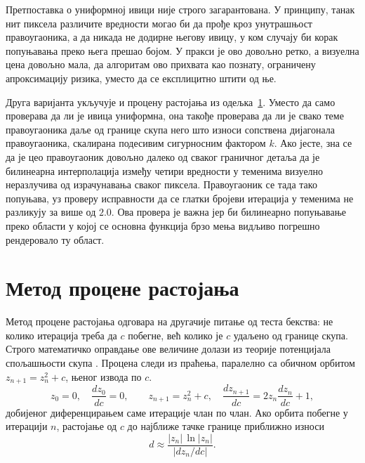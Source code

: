 \documentclass[serbian]{ftndiplomski}
\begin{document}
Претпоставка о униформној ивици није строго загарантована. У принципу, танак нит
пиксела различите вредности могао би да прође кроз унутрашњост правоугаоника, а да
никада не додирне његову ивицу, у ком случају би корак попуњавања преко њега прешао
бојом. У пракси је ово довољно ретко, а визуелна цена довољно мала, да алгоритам ово
прихвата као познату, ограничену апроксимацију ризика, уместо да се експлицитно штити
од ње.

Друга варијанта укључује и процену растојања из одељка~\ref{sec:dem}. Уместо да само
проверава да ли је ивица униформна, она такође проверава да ли је свако теме
правоугаоника даље од границе скупа него што износи сопствена дијагонала
правоугаоника, скалирана подесивим сигурносним фактором $k$. Ако јесте, зна се да је
цео правоугаоник довољно далеко од сваког граничног детаља да је билинеарна
интерполација између четири вредности у теменима визуелно неразлучива од израчунавања
сваког пиксела. Правоугаоник се тада тако попуњава, уз проверу исправности да се
глатки бројеви итерација у теменима не разликују за више од $2.0$. Ова провера је
важна јер би билинеарно попуњавање преко области у којој се основна функција брзо
мења видљиво погрешно рендеровало ту област.

\section{Метод процене растојања}
\label{sec:dem}

Метод процене растојања \cite{peitgensaupe1988} одговара на другачије питање од теста
бекства: не колико итерација треба да $c$ побегне, већ колико је $c$ удаљено од
границе скупа. Строго математичко оправдање ове величине долази из теорије потенцијала
спољашњости скупа \cite{milnor2006}. Процена следи из праћења, паралелно са обичном
орбитом $z_{n+1} = z_n^2 + c$, њеног извода по $c$.
\begin{equation}
  \label{eq:dem-derivative}
  z_0 = 0, \quad \frac{dz_0}{dc} = 0, \qquad
  z_{n+1} = z_n^2 + c, \quad \frac{dz_{n+1}}{dc} = 2 z_n \frac{dz_n}{dc} + 1,
\end{equation}
добијеног диференцирањем саме итерације члан по члан. Ако орбита побегне у итерацији
$n$, растојање од $c$ до најближе тачке границе приближно износи
\begin{equation}
  \label{eq:dem-distance}
  d \approx \frac{|z_n| \, \ln |z_n|}{|dz_n/dc|} .
\end{equation}
\end{document}
